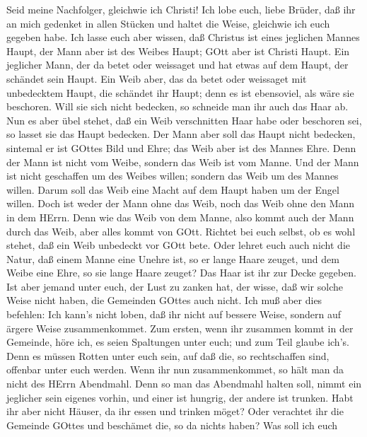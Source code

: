  Seid meine Nachfolger, gleichwie ich Christi! 
Ich lobe euch, liebe Brüder, daß ihr an mich gedenket in allen Stücken
und haltet die Weise, gleichwie ich euch gegeben habe.  Ich
lasse euch aber wissen, daß Christus ist eines jeglichen Mannes Haupt,
der Mann aber ist des Weibes Haupt; GOtt aber ist Christi Haupt.
 Ein jeglicher Mann, der da betet oder weissaget und hat
etwas auf dem Haupt, der schändet sein Haupt.  Ein Weib
aber, das da betet oder weissaget mit unbedecktem Haupt, die schändet
ihr Haupt; denn es ist ebensoviel, als wäre sie beschoren. 
Will sie sich nicht bedecken, so schneide man ihr auch das Haar ab. Nun
es aber übel stehet, daß ein Weib verschnitten Haar habe oder beschoren
sei, so lasset sie das Haupt bedecken.  Der Mann aber soll
das Haupt nicht bedecken, sintemal er ist GOttes Bild und Ehre; das Weib
aber ist des Mannes Ehre.  Denn der Mann ist nicht vom
Weibe, sondern das Weib ist vom Manne.  Und der Mann ist
nicht geschaffen um des Weibes willen; sondern das Weib um des Mannes
willen.  Darum soll das Weib eine Macht auf dem Haupt haben
um der Engel willen.  Doch ist weder der Mann ohne das
Weib, noch das Weib ohne den Mann in dem HErrn.  Denn wie
das Weib von dem Manne, also kommt auch der Mann durch das Weib, aber
alles kommt von GOtt.  Richtet bei euch selbst, ob es wohl
stehet, daß ein Weib unbedeckt vor GOtt bete.  Oder lehret
euch auch nicht die Natur, daß einem Manne eine Unehre ist, so er lange
Haare zeuget,  und dem Weibe eine Ehre, so sie lange Haare
zeuget? Das Haar ist ihr zur Decke gegeben.  Ist aber
jemand unter euch, der Lust zu zanken hat, der wisse, daß wir solche
Weise nicht haben, die Gemeinden GOttes auch nicht.  Ich
muß aber dies befehlen: Ich kann's nicht loben, daß ihr nicht auf
bessere Weise, sondern auf ärgere Weise zusammenkommet. 
Zum ersten, wenn ihr zusammen kommt in der Gemeinde, höre ich, es seien
Spaltungen unter euch; und zum Teil glaube ich's.  Denn es
müssen Rotten unter euch sein, auf daß die, so rechtschaffen sind,
offenbar unter euch werden.  Wenn ihr nun zusammenkommet,
so hält man da nicht des HErrn Abendmahl.  Denn so man das
Abendmahl halten soll, nimmt ein jeglicher sein eigenes vorhin, und
einer ist hungrig, der andere ist trunken.  Habt ihr aber
nicht Häuser, da ihr essen und trinken möget? Oder verachtet ihr die
Gemeinde GOttes und beschämet die, so da nichts haben? Was soll ich euch
